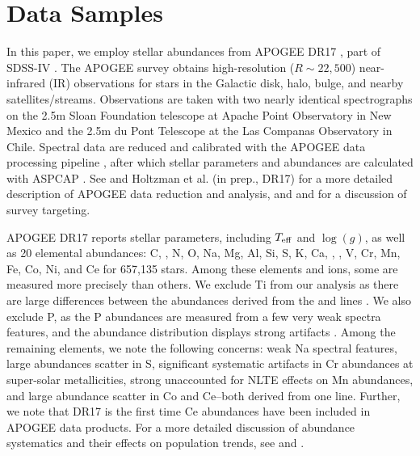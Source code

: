 \documentclass[modern]{aastex631}
\newcommand{\logg}{\log(g)}
\newcommand{\teff}{T_{\rm eff}}
\newcommand{\ejg}[1]{\textcolor{red}{EJG: #1}}
\begin{document}





\section{Data Samples}\label{sec:data}

In this paper, we employ stellar abundances from APOGEE DR17 \citep{abdurrouf2022}, part of SDSS-IV \citep{majewski2017}. The APOGEE survey obtains high-resolution ($R\sim22,500$) near-infrared (IR) observations \citep{wilson2019} for stars in the Galactic disk, halo, bulge, and nearby satellites/streams. Observations are taken with two nearly identical spectrographs on the 2.5m Sloan Foundation telescope \citep{wilson2019} at Apache Point Observatory in New Mexico and the 2.5m du Pont Telescope \citep{bowen1973} at the Las Companas Observatory in Chile. Spectral data are reduced and calibrated with the APOGEE data processing pipeline \citep{nidever2015}, after which stellar parameters and abundances are calculated with ASPCAP \citep[APOGEE Stellar Parameter and Chemical Abundance Pipeline][]{holtzman2015, garcia2016}. See \citet[][DR16]{jonsson2020} and Holtzman et al. (in prep., DR17) for a more detailed description of APOGEE data reduction and analysis, and \citet{zasowski2013, zasowski2017} and \citet{santana2021} for a discussion of survey targeting.

APOGEE DR17 reports stellar parameters, including $\teff$ and $\logg$, as well as 20 elemental abundances: C, , N, O, Na, Mg, Al, Si, S, K, Ca, , , V, Cr, Mn, Fe, Co, Ni, and Ce for 657,135 stars. Among these elements and ions, some are measured more precisely than others. We exclude Ti from our analysis as there are large differences between the abundances derived from the  and  lines \citep{jonsson2020}. We also exclude P, as the P abundances are measured from a few very weak spectra features, and the abundance distribution displays strong artifacts \citep{jonsson2020}. Among the remaining elements, we note the following concerns: weak Na spectral features, large abundances scatter in S, significant systematic artifacts in Cr abundances at super-solar metallicities, strong unaccounted for NLTE effects on Mn abundances, and large abundance scatter in Co and Ce--both derived from one line. Further, we note that DR17 is the first time Ce abundances have been included in APOGEE data products. For a more detailed discussion of abundance systematics and their effects on population trends, see \citet{jonsson2020} and \citet{griffith2021a}.
\end{document}
